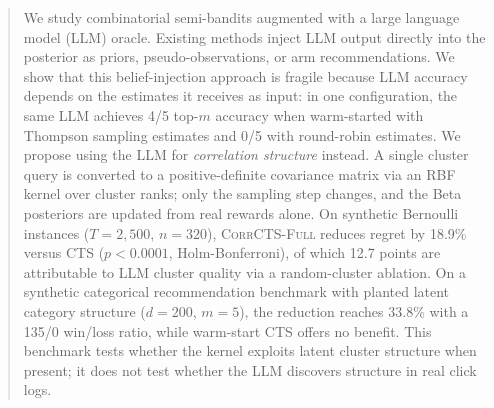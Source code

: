 \documentclass{article}
\theoremstyle{plain}
\theoremstyle{definition}
\theoremstyle{remark}
\newcommand{\CorrFull}{\textsc{CorrCTS-Full}}
\begin{document}

\printAffiliationsAndNotice{}

\begin{abstract}
We study combinatorial semi-bandits augmented with a large language model (LLM) oracle.
Existing methods inject LLM output directly into the posterior as priors, pseudo-observations, or arm recommendations.
We show that this belief-injection approach is fragile because LLM accuracy depends on the estimates it receives as input: in one configuration, the same LLM achieves 4/5 top-$m$ accuracy when warm-started with Thompson sampling estimates and 0/5 with round-robin estimates.
We propose using the LLM for \emph{correlation structure} instead.
A single cluster query is converted to a positive-definite covariance matrix via an RBF kernel over cluster ranks; only the sampling step changes, and the Beta posteriors are updated from real rewards alone.
On synthetic Bernoulli instances ($T{=}2{,}500$, $n{=}320$), \CorrFull{} reduces regret by 18.9\% versus CTS ($p < 0.0001$, Holm-Bonferroni), of which 12.7 points are attributable to LLM cluster quality via a random-cluster ablation.
On a synthetic categorical recommendation benchmark with planted latent category structure ($d{=}200$, $m{=}5$), the reduction reaches 33.8\% with a 135/0 win/loss ratio, while warm-start CTS offers no benefit.
This benchmark tests whether the kernel exploits latent cluster structure when present; it does not test whether the LLM discovers structure in real click logs.
\end{abstract}
\end{document}
